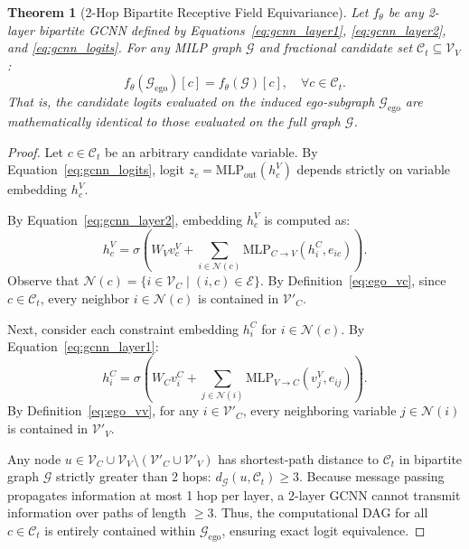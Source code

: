 \documentclass[10pt,twocolumn,letterpaper]{article}
\theoremstyle{plain}
\newtheorem{theorem}{Theorem}
\theoremstyle{definition}
\theoremstyle{remark}
\begin{document}
\begin{theorem}[2-Hop Bipartite Receptive Field Equivariance]
\label{thm:equivariance}
Let $f_\theta$ be any 2-layer bipartite GCNN defined by Equations~\eqref{eq:gcnn_layer1}, \eqref{eq:gcnn_layer2}, and \eqref{eq:gcnn_logits}. For any MILP graph $\mathcal{G}$ and fractional candidate set $\mathcal{C}_t \subseteq \mathcal{V}_V$:
\begin{equation}
    f_\theta(\mathcal{G}_{\text{ego}})[c] = f_\theta(\mathcal{G})[c], \quad \forall c \in \mathcal{C}_t.
\end{equation}
That is, the candidate logits evaluated on the induced ego-subgraph $\mathcal{G}_{\text{ego}}$ are mathematically identical to those evaluated on the full graph $\mathcal{G}$.
\end{theorem}

\begin{proof}
Let $c \in \mathcal{C}_t$ be an arbitrary candidate variable. By Equation~\eqref{eq:gcnn_logits}, logit $z_c = \text{MLP}_{\text{out}}(h_c^V)$ depends strictly on variable embedding $h_c^V$.

By Equation~\eqref{eq:gcnn_layer2}, embedding $h_c^V$ is computed as:
\begin{equation}
    h_c^V = \sigma \left( W_V v_c^V + \sum_{i \in \mathcal{N}(c)} \text{MLP}_{C \to V}(h_i^C, e_{ic}) \right).
\end{equation}
Observe that $\mathcal{N}(c) = \{i \in \mathcal{V}_C \mid (i, c) \in \mathcal{E}\}$. By Definition~\eqref{eq:ego_vc}, since $c \in \mathcal{C}_t$, every neighbor $i \in \mathcal{N}(c)$ is contained in $\mathcal{V}'_C$.

Next, consider each constraint embedding $h_i^C$ for $i \in \mathcal{N}(c)$. By Equation~\eqref{eq:gcnn_layer1}:
\begin{equation}
    h_i^C = \sigma \left( W_C v_i^C + \sum_{j \in \mathcal{N}(i)} \text{MLP}_{V \to C}(v_j^V, e_{ij}) \right).
\end{equation}
By Definition~\eqref{eq:ego_vv}, for any $i \in \mathcal{V}'_C$, every neighboring variable $j \in \mathcal{N}(i)$ is contained in $\mathcal{V}'_V$. 

Any node $u \in \mathcal{V}_C \cup \mathcal{V}_V \setminus (\mathcal{V}'_C \cup \mathcal{V}'_V)$ has shortest-path distance to $\mathcal{C}_t$ in bipartite graph $\mathcal{G}$ strictly greater than 2 hops: $d_{\mathcal{G}}(u, \mathcal{C}_t) \ge 3$. Because message passing propagates information at most 1 hop per layer, a 2-layer GCNN cannot transmit information over paths of length $\ge 3$. Thus, the computational DAG for all $c \in \mathcal{C}_t$ is entirely contained within $\mathcal{G}_{\text{ego}}$, ensuring exact logit equivalence.
\end{proof}
\end{document}
